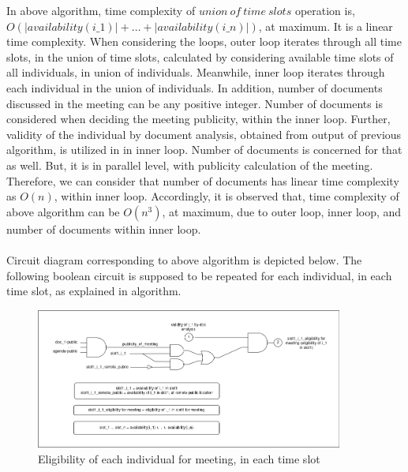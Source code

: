 \documentclass{article}
\begin{document}
In above algorithm, time complexity of $union\ of\ time\ slots$ operation is,\\ $O(|availability(i\_1)| + \dots + |availability(i\_n)|)$, at maximum. It is a linear time complexity. When considering the loops, outer loop iterates through all time slots, in the union of time slots, calculated by considering available time slots of all individuals, in union of individuals. Meanwhile, inner loop iterates through each individual in the union of individuals. In addition, number of documents discussed in the meeting can be any positive integer. Number of documents is considered when deciding the meeting publicity, within the inner loop. Further, validity of the individual by document analysis, obtained from output of previous algorithm, is utilized in in inner loop. Number of documents is concerned for that as well. But, it is in parallel level, with publicity calculation of the meeting. Therefore, we can consider that number of documents has linear time complexity as $O(n)$, within inner loop. Accordingly, it is observed that, time complexity of above algorithm can be $O(n^{3})$, at maximum, due to outer loop, inner loop, and number of documents within inner loop.\\ \\
Circuit diagram corresponding to above algorithm is depicted below. The following boolean circuit is supposed to be repeated for each individual, in each time slot, as explained in algorithm.
\begin{figure}[H]
    \centering
    \includegraphics[width=0.9\textwidth]{./image/circuit_diagram/2_slot_n_i_n_eligibility.png}
    \caption{Eligibility of each individual for meeting, in each time slot}
    \label{fig:eligibility of each individual for meeting, in each time slot}
\end{figure} 
\end{document}
